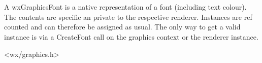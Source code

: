 
\section{}\label{wxgraphicsfont}



A wxGraphicsFont is a native representation of a font (including text colour). The contents are specific an private to the respective renderer. Instances are ref counted 
and can therefore be assigned as usual. The only way to get a valid instance is via a CreateFont call on the graphics context or the renderer instance.


<wx/graphics.h>




